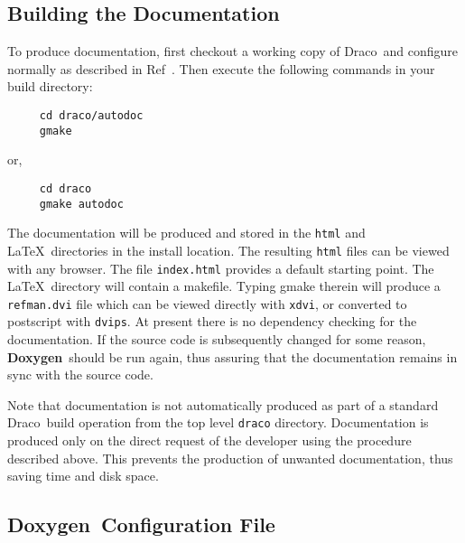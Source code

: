 \documentclass[11pt]{nmemo}
\newcommand{\draco}{{\normalfont\sffamily Draco}}
\newcommand{\doxy}{{\normalfont\bfseries Doxygen}}
\begin{document}
\subsection{Building the Documentation}

To produce documentation, first checkout a working copy of \draco\ 
and configure normally as described in  Ref~\cite{draco-build}.
Then execute the following commands in your build directory:
\begin{verbatim} 
     cd draco/autodoc
     gmake 
\end{verbatim}
or,
\begin{verbatim} 
     cd draco
     gmake autodoc
\end{verbatim}
The documentation will be produced and stored in the
\texttt{html} and \LaTeX\ directories in the install location.
The resulting \texttt{html} files can be viewed with any browser. The
file \texttt{index.html} provides a default starting point. The \LaTeX\
directory will contain a makefile. Typing gmake therein will produce 
a \texttt{refman.dvi} file which can be viewed directly with \texttt{xdvi},
or converted to postscript with \texttt{dvips}. At present there
is no dependency checking for the documentation.
If the source code is subsequently changed for some reason,
\doxy\ should be run again, thus assuring that the documentation 
remains in sync with the source code.

Note that documentation is not automatically produced as part of 
a standard \draco\ build operation from the top level \texttt{draco} 
directory. Documentation is produced only on the direct request 
of the developer using the procedure described above. This prevents
the production of unwanted documentation, thus saving time and disk 
space.


\subsection{\doxy\ Configuration File}
\label{sec:config}
\end{document}
